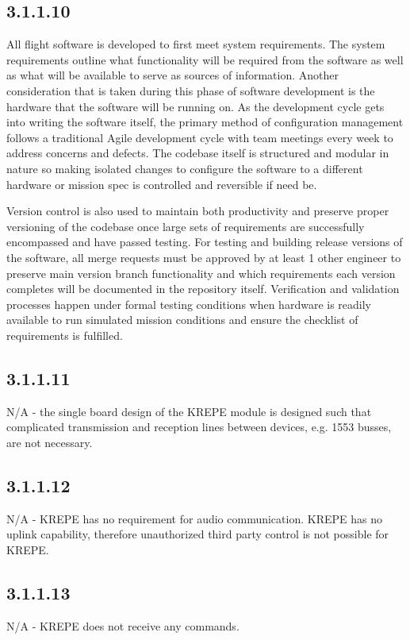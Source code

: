 \documentclass{article}
\begin{document}
\subsection{3.1.1.10}
All flight software is developed to first meet system requirements. The system requirements outline what functionality will be required from the software as well as what will be available to serve as sources of information. Another consideration that is taken during this phase of software development is the hardware that the software will be running on. As the development cycle gets into writing the software itself, the primary method of configuration management follows a traditional Agile development cycle with team meetings every week to address concerns and defects. The codebase itself is structured and modular in nature so making isolated changes to configure the software to a different hardware or mission spec is controlled and reversible if need be.

Version control is also used to maintain both productivity and preserve proper versioning of the codebase once large sets of requirements are successfully encompassed and have passed testing. For testing and building release versions of the software, all merge requests must be approved by at least 1 other engineer to preserve main version branch functionality and which requirements each version completes will be documented in the repository itself. Verification and validation processes happen under formal testing conditions when hardware is readily available to run simulated mission conditions and ensure the checklist of requirements is fulfilled. 

\subsection{3.1.1.11}
N/A - the single board design of the KREPE module is designed such that complicated transmission and reception lines between devices, e.g. 1553  busses, are not necessary.

\subsection{3.1.1.12}
N/A - KREPE has no requirement for audio communication. KREPE has no uplink capability, therefore unauthorized third party control is not possible for KREPE.

\subsection{3.1.1.13}
N/A - KREPE does not receive any commands.
\fi

%
%
\end{document}

